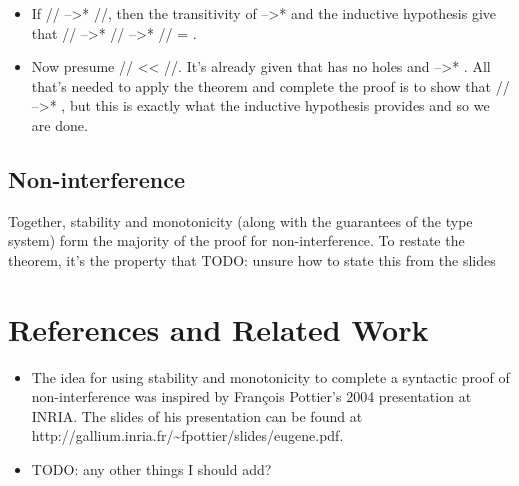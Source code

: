 \documentclass[12pt]{report}
\begin{document}
\begin{itemize}
\item  If // -->* //, then the transitivity of -->* and the
      inductive hypothesis give that // -->* // -->* //
      = .



\item  Now presume // << //. It's already given that  has
      no holes and  -->* . All that's needed to apply the
       theorem and complete the proof is to show that
      // -->* , but this is exactly what the inductive
      hypothesis provides and so we are done.

\end{itemize}




\section{Non-interference}



 Together, stability and monotonicity (along with the guarantees
of the type system) form the majority of the proof for
non-interference. To restate the theorem, it's the property that
TODO: unsure how to state this from the slides 

\chapter{References and Related Work}






\begin{itemize}
\item  The idea for using stability and monotonicity to complete
  a syntactic proof of non-interference was inspired by François
  Pottier's 2004 presentation at INRIA. The slides of his
  presentation can be found at
  http://gallium.inria.fr/\~{}fpottier/slides/eugene.pdf.



\item  TODO: any other things I should add?

\end{itemize}


\begin{coqdoccode}
\coqdocemptyline
\coqdocemptyline
\end{coqdoccode}
\end{document}
